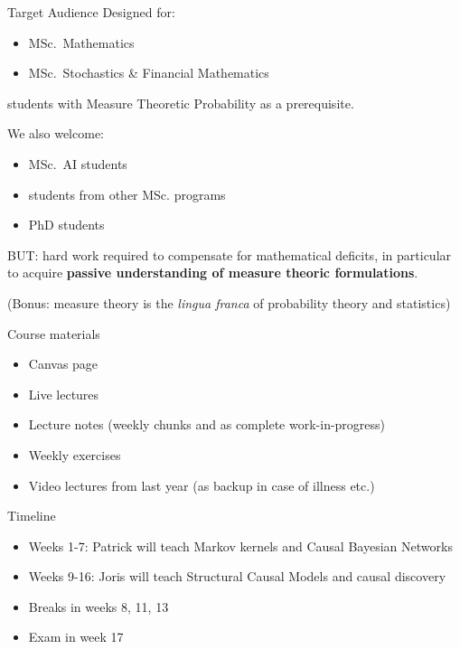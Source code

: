 \begin{frame}{Target Audience}
  Designed for:
  \begin{itemize}
    \item MSc.\ Mathematics
    \item MSc.\ Stochastics \& Financial Mathematics
  \end{itemize}
  students with Measure Theoretic Probability as a prerequisite.

  \bigskip
  We also welcome:
  \begin{itemize}
    \item MSc.\ AI students
    \item students from other MSc. programs
    \item PhD students
  \end{itemize}
  BUT: hard work required to compensate for mathematical deficits, in particular to acquire \textbf{passive understanding of measure theoric formulations}.
  
  \bigskip
  (Bonus: measure theory is the \textit{lingua franca} of probability theory and statistics)
\end{frame}

\begin{frame}{Course materials}
  \begin{itemize}
    \item Canvas page
    \item Live lectures
    \item Lecture notes (weekly chunks and as complete work-in-progress)
    \item Weekly exercises
    \item Video lectures from last year (as backup in case of illness etc.)
  \end{itemize}
\end{frame}

\begin{frame}{Timeline}
  \begin{itemize}
    \item Weeks 1-7: Patrick will teach Markov kernels and Causal Bayesian Networks
    \item Weeks 9-16: Joris will teach Structural Causal Models and causal discovery
    \item Breaks in weeks 8, 11, 13
    \item Exam in week 17
  \end{itemize}
\end{frame}

